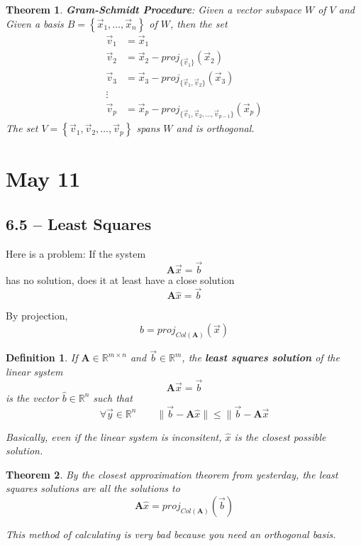 \documentclass[11pt]{article}
\newtheorem{thm}{Theorem}
\newtheorem{defn}{Definition}
\begin{document}
\begin{thm}
  \textbf{Gram-Schmidt Procedure}:
  Given a vector subspace $W$ of $V$ and Given a basis $B = \left\{\vec{x}_{1}, \ldots, \vec{x}_{n}\right\}$ of $W$, then the set
    \begin{align*}
      \vec{v}_{1} &= \vec{x}_{1}\\
      \vec{v}_{2} &= \vec{x}_{2} - proj_{\{\vec{v}_{1}\}}(\vec{x}_{2}) \\
      \vec{v}_{3} &= \vec{x}_{3} - proj_{\{\vec{v}_{1}, \vec{v}_{2}\}}(\vec{x}_{3}) \\
      \vdots \\
      \vec{v}_{p} &= \vec{x}_{p} - proj_{\{\vec{v}_{1}, \vec{v}_{2}, \ldots, \vec{v}_{p-1}\}}(\vec{x}_{p})
    \end{align*}
    The set $V = \left\{\vec{v}_{1}, \vec{v}_{2}, \ldots, \vec{v}_{p}\right\}$ spans $W$ and is orthogonal.
\end{thm}
\section{May 11}
\subsection{6.5 -- Least Squares}

Here is a problem: If the system
\[\mathbf{A}\vec{x} = \vec{b}\]
has no solution, does it at least have a close solution
\[\mathbf{A}\hat{x} = \vec{b}\]


By projection,
\[\hat{b} = proj_{Col(\mathbf{A})}(\vec{x})\]

\begin{defn}
  If $\mathbf{A} \in \mathbb{R}^{m \times n}$ and $\vec{b} \in \mathbb{R}^{m}$, the \textbf{least squares solution} of the linear system
  \[\mathbf{A}\vec{x} = \vec{b}\]
  is the vector $\hat{b} \in \mathbb{R}^{n}$ such that
  \[\forall \vec{y} \in \mathbb{R}^{n} \qquad \| \vec{b} - \mathbf{A}\hat{x} \| \le \| \vec{b} - \mathbf{A} \vec{x}\]

  Basically, even if the linear system is inconsitent, $\hat{x}$ is the closest possible solution.

\end{defn}

\begin{thm}
  By the closest approximation theorem from yesterday, the least squares solutions are all the solutions to
  \[\mathbf{A}\hat{x} = proj_{Col(\mathbf{A})}(\vec{b})\]

  This method of calculating is very bad because you need an orthogonal basis.
\end{thm}
\end{document}
